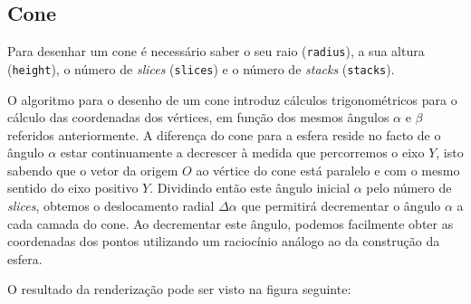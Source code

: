 \documentclass[a4paper, 11pt]{article}
\begin{document}
\subsection{Cone}

Para desenhar um cone é necessário saber o seu raio (\texttt{radius}), a sua
altura (\texttt{height}), o número de \textit{slices} (\texttt{slices}) e o número de 
\textit{stacks} (\texttt{stacks}).

O algoritmo para o desenho de um cone introduz cálculos trigonométricos para o cálculo das 
coordenadas dos vértices, em função dos mesmos ângulos $\alpha$ e $\beta$ referidos anteriormente. 
A diferença do cone para a esfera reside no facto de o ângulo $\alpha$ estar continuamente a
decrescer à medida que percorremos o eixo $Y$, isto sabendo que o vetor da origem $O$ ao vértice
do cone está paralelo e com o mesmo sentido do eixo positivo $Y$. Dividindo então este ângulo
inicial $\alpha$ pelo número de \textit{slices}, obtemos o deslocamento radial $\Delta\alpha$ que 
permitirá decrementar o ângulo $\alpha$ a cada camada do cone. Ao decrementar este ângulo, podemos
facilmente obter as coordenadas dos pontos utilizando um raciocínio análogo ao da construção
da esfera. 

\pagebreak 
O resultado da renderização pode ser visto na figura seguinte:
\end{document}
